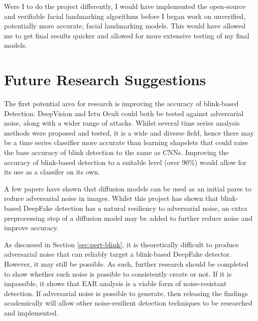 Were I to do the project differently, I would have implemented the open-source and verifiable facial landmarking algorithms before I began work on unverified, potentially more accurate, facial landmarking models. This would have allowed me to get final results quicker and allowed for more extensive testing of my final models. 

\section{Future Research Suggestions}


The first potential area for research is improving the accuracy of blink-based Detection. DeepVision and Ictu Oculi could both be tested against adversarial noise, along with a wider range of attacks. Whilst several time series analysis methods were proposed and tested, it is a wide and diverse field, hence there may be a time series classifier more accurate than learning shapelets that could raise the base accuracy of blink detection to the same as CNNs. Improving the accuracy of blink-based detection to a suitable level (over 90\%) would allow for its use as a classifer on its own.

A few papers have shown that diffusion models can be used as an initial parse to reduce adversarial noise in images\cite{nie2022diffusion}\cite{croitoru2023diffusion}\cite{ankile2023denoising}. Whilst this project has shown that blink-based DeepFake detection has a natural resiliency to adversarial noise, an extra preprocessing step of a diffusion model may be added to further reduce noise and improve accuracy.

As discussed in Section \ref{sec:pert-blink}, it is theoretically difficult to produce adversarial noise that can reliably target a blink-based DeepFake detector. However, it may still be possible. As such, further research should be completed to show whether such noise is possible to consistently create or not. If it is impossible, it shows that EAR analysis is a viable form of noise-resistant detection. If adversarial noise is possible to generate, then releasing the findings academically will allow other noise-resilient detection techniques to be researched and implemented.


